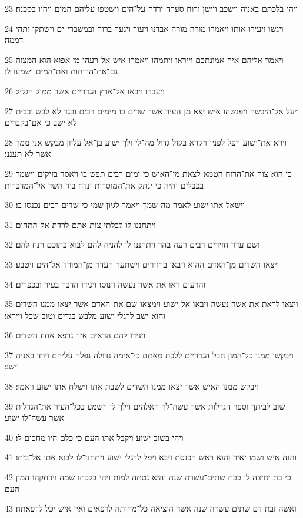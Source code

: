 \par 23 ויהי בלכתם באניה וישכב ויישן ורוח סערה ירדה על־הים וישטפו עליהם המים ויהיו בסכנה׃
\par 24 ויגשו ויעירו אותו ויאמרו מורה מורה אבדנו ויעור ויגער ברוח ובמשברי־ים וישתקו ותהי דממה׃
\par 25 ויאמר אליהם איה אמונתכם וייראו ויתמהו ויאמרו איש אל־רעהו מי אפוא הוא המצוה גם־את־הרוחות ואת־המים ושמעו לו׃
\par 26 ויעברו ויבאו אל־ארץ הגדריים אשר ממול הגליל׃
\par 27 ויעל אל־היבשה ויפגשהו איש יצא מן העיר אשר שדים בו מימים רבים ובגד לא לבש ובבית לא ישב כי אם־בקברים׃
\par 28 וירא את־ישוע ויפל לפניו ויקרא בקול גדול מה־לי ולך ישוע בן־אל עליון מבקש אני ממך אשר לא תענני׃
\par 29 כי הוא צוה את־הרוח הטמא לצאת מן־האיש כי ימים רבים תפש בו ויאסר בזיקים וישמר בכבלים והיה כי ינתק את־המוסרות ונדח ביד השד אל־המדברות׃
\par 30 וישאל אתו ישוע לאמר מה־שמך ויאמר לגיון שמי כי־שדים רבים נכנסו בו׃
\par 31 ויתחננו לו לבלתי צות אתם לרדת אל־התהום׃
\par 32 ושם עדר חזירים רבים רעה בהר ויתחננו לו להניח להם לבוא בתוכם וינח להם׃
\par 33 ויצאו השדים מן־האדם ההוא ויבאו בחזירים וישתער העדר מן־המורד אל־הים ויטבע׃
\par 34 והרעים ראו את אשר נעשה וינוסו ויגידו הדבר בעיר ובכפרים׃
\par 35 ויצאו לראת את אשר נעשה ויבאו אל־ישוע וימצאו־שם את־האדם אשר יצאו ממנו השדים והוא ישב לרגלי ישוע מלבש בגדים וטוב־שכל וייראו׃
\par 36 ויגידו להם הראים איך נרפא אחוז השדים׃
\par 37 ויבקשו ממנו כל־המון חבל הגדריים ללכת מאתם כי־אימה גדולה נפלה עליהם וירד באניה וישב׃
\par 38 ויבקש ממנו האיש אשר יצאו ממנו השדים לשבת אתו וישלח אתו ישוע ויאמר׃
\par 39 שוב לביתך וספר הגדלות אשר עשה־לך האלהים וילך לו וישמע בכל־העיר את־הגדלות אשר עשה־לו ישוע׃
\par 40 ויהי בשוב ישוע ויקבל אתו העם כי כלם היו מחכים לו׃
\par 41 והנה איש ושמו יאיר והוא ראש הכנסת ויבא ויפל לרגלי ישוע ויתחנן־לו לבוא אתו אל־ביתו׃
\par 42 כי בת יחידה לו כבת שתים־עשרה שנה והיא נטתה למות ויהי בלכתו שמה וידחקהו המון העם׃
\par 43 ואשה זבת דם שתים עשרה שנה אשר הוציאה כל־מחיתה לרפאים ואין איש יכל לרפאתה׃

